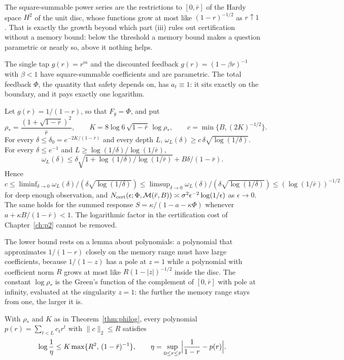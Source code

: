 The square-summable power series are the restrictions to $[0,\bar r]$ of the Hardy space $H^2$ of the unit disc, whose functions grow at most like $(1-r)^{-1/2}$ as $r\uparrow1$. That is exactly the growth beyond which part (iii) rules out certification without a memory bound: below the threshold a memory bound makes a question parametric or nearly so, above it nothing helps.

The single tap $g(r)=r^m$ and the discounted feedback $g(r)=(1-\beta r)^{-1}$ with $\beta<1$ have square-summable coefficients and are parametric. The total feedback $\Phi$, the quantity that safety depends on, has $a_t\equiv1$: it sits exactly on the boundary, and it pays exactly one logarithm.

\begin{theorem}\label{thm:philog}
Let $g(r)=1/(1-r)$, so that $F_g=\Phi$, and put
\[
\rho_*=\frac{(1+\sqrt{1-\bar r})^2}{\bar r},\qquad K=8\log6\,\sqrt{1-\bar r}\,\log\rho_*,\qquad c=\min\{B,(2K)^{-1/2}\}.
\]
For every $\delta\le\delta_0=e^{-2K/(1-\bar r)}$ and every depth $L$, $\omega_L(\delta)\ge c\,\delta\sqrt{\log(1/\delta)}$. For every $\delta\le e^{-1}$ and $L\ge\log(1/\delta)/\log(1/\bar r)$,
\[
\omega_L(\delta)\le\delta\sqrt{1+\log(1/\delta)/\log(1/\bar r)}+B\delta/(1-\bar r).
\]
Hence $c\le\liminf_{\delta\to0}\omega_L(\delta)/(\delta\sqrt{\log(1/\delta)})\le\limsup_{\delta\to0}\omega_L(\delta)/(\delta\sqrt{\log(1/\delta)})\le(\log(1/\bar r))^{-1/2}$ for deep enough observation, and $N_{\rm cert}(\epsilon;\Phi,\mathcal M(\bar r,B))\asymp\sigma^2\epsilon^{-2}\log(1/\epsilon)$ as $\epsilon\to0$. The same holds for the summed response $S=\kappa/(1-a-\kappa\Phi)$ whenever $a+\kappa B/(1-\bar r)<1$. The logarithmic factor in the certification cost of Chapter~\ref{ch:p2} cannot be removed. \hfill\Proved
\end{theorem}

The lower bound rests on a lemma about polynomials: a polynomial that approximates $1/(1-r)$ closely on the memory range must have large coefficients, because $1/(1-z)$ has a pole at $z=1$ while a polynomial with coefficient norm $R$ grows at most like $R(1-|z|)^{-1/2}$ inside the disc. The constant $\log\rho_*$ is the Green's function of the complement of $[0,\bar r]$ with pole at infinity, evaluated at the singularity $z=1$: the further the memory range stays from one, the larger it is.

\begin{lemma}\label{lem:hardy}
With $\rho_*$ and $K$ as in Theorem~\ref{thm:philog}, every polynomial $p(r)=\sum_{t<L}c_tr^t$ with $\|c\|_2\le R$ satisfies
\[
\log\frac1\eta\le K\max\{R^2,\,(1-\bar r)^{-1}\},\qquad \eta=\sup_{0\le r\le\bar r}\Bigl|\frac1{1-r}-p(r)\Bigr| .
\]
\end{lemma}

